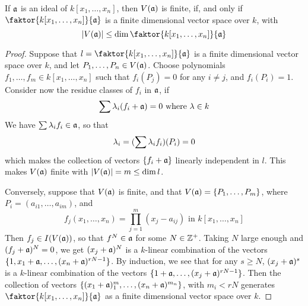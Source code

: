 \begin{corollary}
    If $\mathfrak{a}$ is an ideal of  $k[x_1, \dots, x_n]$, then $V(\mathfrak{a})$ is finite, if,
    and only if $\faktor{k[x_1,\dots,x_n]}{\af}$ is a finite dimensional vector
    space over $k$, with
    \begin{equation*}
        |V(\af)| \leq \dim{\faktor{k[x_1,\dots,x_n]}{\af}}
    \end{equation*}
\end{corollary}
\begin{proof}
    Suppose that $l=\faktor{k[x_1,\dots,x_n]}{\af}$ is a finite dimensional
    vector space over $k$, and let  $P_1, \dots, P_n \in V(\mathfrak{a})$. Choose
    polynomials $f_1, \dots, f_m \in k[x_1, \dots, x_n]$ such that $f_i(P_j)=0$
    for any $i \neq j$, and $f_i(P_i)=1$. Consider now the residue classes of
    $f_i$ in $\mathfrak{a}$, if
    \begin{equation*}
        \sum{\lambda_i(f_i+\mathfrak{a})}=0 \text{ where } \lambda \in k
    \end{equation*}
    We have $\sum{\lambda_if_i} \in \mathfrak{a}$, so that
    \begin{equation*}
        \lambda_i=(\sum{\lambda_if_i})(P_i)=0
    \end{equation*}
    which makes the collection of vectors $\{f_i+\mathfrak{a}\}$ linearly independent in
    $l$. This makes $V(\mathfrak{a})$ finite with $|V(\mathfrak{a})|=m \leq \dim{l}$.

    Conversely, suppose that $V(\mathfrak{a})$ is finite, and that $V(\mathfrak{a})=\{P_1, \dots,
    P_m\}$, where $P_i=(a_{i1}, \dots, a_{im})$, and
    \begin{equation*}
        f_j(x_1, \dots, x_n)=\prod_{j=1}^m{(x_j-a_{ij})} \text{ in } k[x_1,
        \dots, x_n]
    \end{equation*}
    Then $f_j \in I(V(\mathfrak{a}))$, so that $f^N \in \mathfrak{a}$ for some $N \in \mathbb{Z}^+$. Taking
    $N$ large enough and $(f_j+\mathfrak{a})^N=0$, we get $(x_j+\mathfrak{a})^N$ is a $k$-linear
    combination of the vectors $\{1, x_1+\mathfrak{a}, \dots, (x_n+\mathfrak{a})^{rN-1}\}$. By
    induction, we see that for any $s \geq N$, $(x_j+\mathfrak{a})^s$ is a $k$-linear
    combination of the vectors $\{1+\mathfrak{a}, \dots, (x_j+\mathfrak{a})^{rN-1}\}$. Then the
    collection of vectors $\{(x_1+\mathfrak{a})^m_1, \dots, (x_n+\mathfrak{a})^{m_n}\}$, with
    $m_i<rN$ generates $\faktor{k[x_1,\dots,x_n]}{\af}$ as a finite dimensional
    vector space over $k$.
\end{proof}
